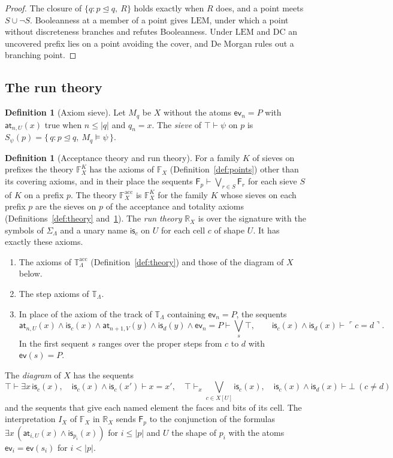 \documentclass{lmcs}
\theoremstyle{definition}
\newtheorem{definition}[theorem]{Definition}
\theoremstyle{remark}
\newcommand{\Tt}{\mathbb{T}}
\newcommand{\dimn}[1]{\lvert #1\rvert}
\newcommand{\ip}{\mathsf{ev}}
\newcommand{\prin}[1]{\mathrm{#1}}
\newcommand{\EM}{\prin{LEM}}
\newcommand{\Der}{\vdash}
\newcommand{\TR}{\Tt_{\Lambda}}
\newcommand{\SigR}{\Sigma_{\Lambda}}
\newcommand{\pprop}[1]{\ulcorner #1\urcorner}
\newcommand{\ext}{\trianglelefteq}
\newcommand{\FX}[1]{\mathbb{F}_{#1}}
\newcommand{\RX}[1]{\mathbb{R}_{#1}}
\newcommand{\IX}[1]{I_{#1}}
\newcommand{\fat}[1]{\mathsf{F}_{#1}}
\newcommand{\nm}[1]{\mathsf{is}_{#1}}
\providecommand{\DC}{\prin{DC}}
\providecommand{\Tacc}{\Tt^{\mathrm{acc}}_{\Lambda}}
\providecommand{\evat}[2]{\ip_{#1}=#2}
\begin{document}
\begin{proof}
The closure of $\{q : p\ext q,\ R\}$ holds exactly when $R$ does, and a point
meets $S\cup\neg S$. Booleanness at a member of a point gives $\EM$, under which a
point without discreteness branches and refutes Booleanness. Under $\EM$ and $\DC$ an uncovered prefix lies on a point avoiding
the cover, and De Morgan rules out a branching
point.
\end{proof}

\subsection{The run theory}\label{ssec:theories}

\begin{definition}[Axiom sieve]\label{def:setup-axsieve}
Let $M_q$ be $X$ without the atoms $\evat{n}{P}$ with $\mathsf{at}_{n,U}(x)$ true when $n\leq\dimn{q}$ and
$q_n=x$. The \emph{sieve} of $\top\Der\psi$ on $p$ is
$S_\psi(p)=\{\,q : p\ext q,\ M_q\models\psi\,\}$.
\end{definition}

\begin{definition}[Acceptance theory and run theory]\label{def:machine-theories}
For a family $K$ of sieves on prefixes the theory $\FX{X}^{K}$ has the axioms of $\FX{X}$
(Definition~\ref{def:points}) other than its covering axioms, and in their place the sequents
$\fat{p}\Der\bigvee_{r\in S}\fat{r}$ for each sieve $S$ of $K$ on a prefix $p$. The theory
$\FX{X}^{\mathrm{acc}}$ is $\FX{X}^{K}$ for the family $K$ whose sieves on each prefix $p$ are the sieves on $p$ of
the acceptance and totality axioms (Definitions~\ref{def:theory} and~\ref{def:setup-axsieve}).
The \emph{run theory} $\RX{X}$ is over the signature with the symbols of $\SigR$ and a unary name $\nm{c}$ on $U$
for each cell $c$ of shape $U$. It has exactly these axioms.
\begin{enumerate}
\item The axioms of $\Tacc$ (Definition~\ref{def:theory}) and those of the diagram of $X$
  below.
\item The step axioms of $\TR$.
\item In place of the axiom of the track of $\TR$ containing $\evat{n}{P}$, the sequents
  \[
    \mathsf{at}_{n,U}(x)\wedge\nm{c}(x)\wedge\mathsf{at}_{n+1,V}(y)\wedge\nm{d}(y)\wedge\evat{n}{P}\Der\textstyle\bigvee_s\top,
    \qquad \nm{c}(x)\wedge\nm{d}(x)\Der\pprop{c=d}.
  \]
  In the first sequent $s$ ranges over the proper steps from $c$ to $d$ with $\ip(s)=P$.
\end{enumerate}
The \emph{diagram} of $X$ has the sequents
\[
  \top\Der\exists x\,\nm{c}(x),\quad \nm{c}(x)\wedge\nm{c}(x')\Der x=x',\quad
  \top\Der_x\textstyle\bigvee_{c\in X[U]}\nm{c}(x),\quad \nm{c}(x)\wedge\nm{d}(x)\Der\bot\ (c\neq d)
\]
and the sequents that give each named element the faces and bits of its cell. The
interpretation $\IX{X}$ of $\FX{X}$ in $\RX{X}$ sends $\fat{p}$ to the conjunction of the formulas
$\exists x\,(\mathsf{at}_{i,U}(x)\wedge\nm{p_i}(x))$ for $i\leq\dimn{p}$ and $U$ the shape of $p_i$ with the atoms
$\evat{i}{\ip(s_i)}$ for $i<\dimn{p}$.
\end{definition}
\end{document}
